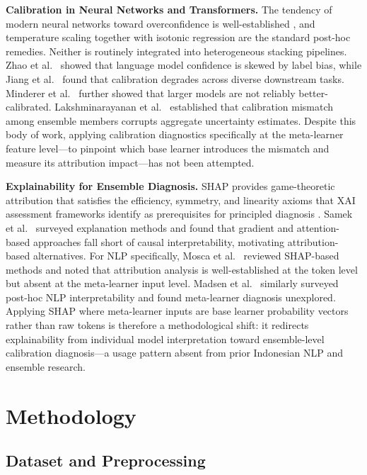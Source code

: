 \documentclass[conference]{IEEEtran}
\begin{document}
\textbf{Calibration in Neural Networks and Transformers.}
The tendency of modern neural networks toward overconfidence is well-established \cite{b15}, and temperature scaling together with isotonic regression are the standard post-hoc remedies. Neither is routinely integrated into heterogeneous stacking pipelines. Zhao et al.\ \cite{b16} showed that language model confidence is skewed by label bias, while Jiang et al.\ \cite{b13} found that calibration degrades across diverse downstream tasks. Minderer et al.\ \cite{b18} further showed that larger models are not reliably better-calibrated. Lakshminarayanan et al.\ \cite{b17} established that calibration mismatch among ensemble members corrupts aggregate uncertainty estimates. Despite this body of work, applying calibration diagnostics specifically at the meta-learner feature level---to pinpoint which base learner introduces the mismatch and measure its attribution impact---has not been attempted.

\textbf{Explainability for Ensemble Diagnosis.}
SHAP \cite{b11} provides game-theoretic attribution that satisfies the efficiency, symmetry, and linearity axioms that XAI assessment frameworks identify as prerequisites for principled diagnosis \cite{b27}. Samek et al.\ \cite{b12} surveyed explanation methods and found that gradient and attention-based approaches fall short of causal interpretability, motivating attribution-based alternatives. For NLP specifically, Mosca et al.\ \cite{b31} reviewed SHAP-based methods and noted that attribution analysis is well-established at the token level but absent at the meta-learner input level. Madsen et al.\ \cite{b20} similarly surveyed post-hoc NLP interpretability and found meta-learner diagnosis unexplored. Applying SHAP where meta-learner inputs are base learner probability vectors rather than raw tokens is therefore a methodological shift: it redirects explainability from individual model interpretation toward ensemble-level calibration diagnosis---a usage pattern absent from prior Indonesian NLP and ensemble research.

\section{Methodology}

\subsection{Dataset and Preprocessing}
\end{document}
